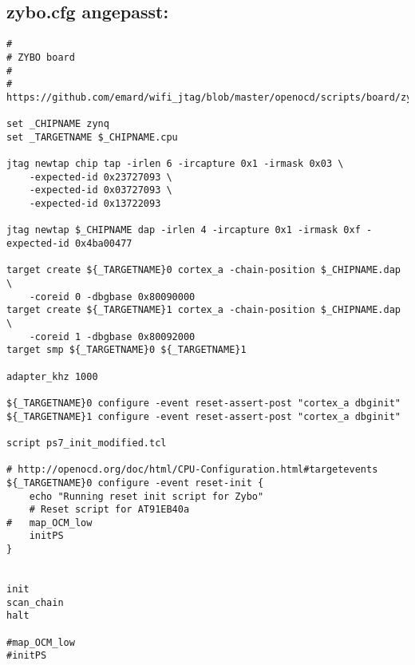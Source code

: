 \subsection{zybo.cfg angepasst:}
\label{anhang:zybo.cfg}
\lstset{language=tcl}
\begin{lstlisting}
#
# ZYBO board
#
# https://github.com/emard/wifi_jtag/blob/master/openocd/scripts/board/zybo.cfg 

set _CHIPNAME zynq
set _TARGETNAME $_CHIPNAME.cpu

jtag newtap chip tap -irlen 6 -ircapture 0x1 -irmask 0x03 \
    -expected-id 0x23727093 \
    -expected-id 0x03727093 \
    -expected-id 0x13722093

jtag newtap $_CHIPNAME dap -irlen 4 -ircapture 0x1 -irmask 0xf -expected-id 0x4ba00477

target create ${_TARGETNAME}0 cortex_a -chain-position $_CHIPNAME.dap \
    -coreid 0 -dbgbase 0x80090000
target create ${_TARGETNAME}1 cortex_a -chain-position $_CHIPNAME.dap \
    -coreid 1 -dbgbase 0x80092000
target smp ${_TARGETNAME}0 ${_TARGETNAME}1

adapter_khz 1000

${_TARGETNAME}0 configure -event reset-assert-post "cortex_a dbginit"
${_TARGETNAME}1 configure -event reset-assert-post "cortex_a dbginit"

script ps7_init_modified.tcl

# http://openocd.org/doc/html/CPU-Configuration.html#targetevents
${_TARGETNAME}0 configure -event reset-init {
	echo "Running reset init script for Zybo"
	# Reset script for AT91EB40a
#	map_OCM_low
	initPS
}


init
scan_chain
halt

#map_OCM_low
#initPS
\end{lstlisting}


\label{anhang:zynq_7000.cfg}




